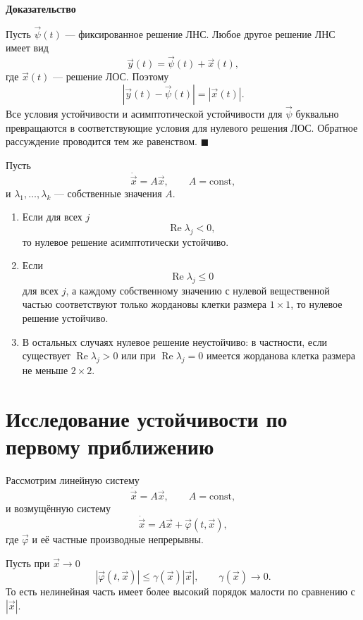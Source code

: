 \documentclass[12pt,a4paper]{article}
\numberwithin{equation}{section}
\renewcommand{\Re}{\operatorname{Re}}
\newcommand{\vect}[1]{\vec{#1}}
\renewenvironment{proof}[1][Доказательство]{\begin{center}\textbf{#1}\end{center}}{\hfill$\blacksquare$\par}
\DeclareRobustCommand{\examtag}[1]{\space{\normalfont\small\color{HSEgray}(#1)}}
\begin{document}
\begin{proof}
Пусть $\vect{\psi}(t)$ --- фиксированное решение ЛНС. Любое другое решение ЛНС имеет вид
\[
\vect{y}(t)=\vect{\psi}(t)+\vect{x}(t),
\]
где $\vect{x}(t)$ --- решение ЛОС. Поэтому
\[
|\vect{y}(t)-\vect{\psi}(t)|=|\vect{x}(t)|.
\]
Все условия устойчивости и асимптотической устойчивости для $\vect{\psi}$ буквально превращаются в соответствующие условия для нулевого решения ЛОС. Обратное рассуждение проводится тем же равенством.
\end{proof}

\begin{theoremHSE}
Пусть
\[
\dot{\vect{x}}=A\vect{x},
\qquad A=\text{const},
\]
и $\lambda_1,\ldots,\lambda_k$ --- собственные значения $A$.
\begin{enumerate}
  \item Если для всех $j$
  \[
  \Re\lambda_j<0,
  \]
  то нулевое решение асимптотически устойчиво.
  \item Если
  \[
  \Re\lambda_j\le0
  \]
  для всех $j$, а каждому собственному значению с нулевой вещественной частью соответствуют только жордановы клетки размера $1\times1$, то нулевое решение устойчиво.
  \item В остальных случаях нулевое решение неустойчиво: в частности, если существует $\Re\lambda_j>0$ или при $\Re\lambda_j=0$ имеется жорданова клетка размера не меньше $2\times2$.
\end{enumerate}
\end{theoremHSE}

\section[Устойчивость по первому приближению\examtag{вопрос~29}]{Исследование устойчивости по первому приближению\examtag{вопрос~29}}

Рассмотрим линейную систему
\[
\dot{\vect{x}}=A\vect{x},
\qquad A=\text{const},
\]
и возмущённую систему
\begin{equation}
\dot{\vect{x}}=A\vect{x}+\vect{\varphi}(t,\vect{x}),
\label{eq:first-approx}
\end{equation}
где $\vect{\varphi}$ и её частные производные непрерывны.

Пусть при $\vect{x}\to0$
\[
|\vect{\varphi}(t,\vect{x})|
\le
\gamma(\vect{x})|\vect{x}|,
\qquad
\gamma(\vect{x})\to0.
\]
То есть нелинейная часть имеет более высокий порядок малости по сравнению с $|\vect{x}|$.
\end{document}
